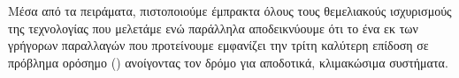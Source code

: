 Μέσα από τα πειράματα, πιστοποιούμε έμπρακτα όλους τους θεμελιακούς ισχυρισμούς της τεχνολογίας που μελετάμε ενώ παράλληλα αποδεικνύουμε ότι το ένα εκ των γρήγορων παραλλαγών που προτείνουμε εμφανίζει την τρίτη καλύτερη επίδοση σε πρόβλημα ορόσημο () ανοίγοντας τον δρόμο για αποδοτικά, κλιμακώσιμα συστήματα.






